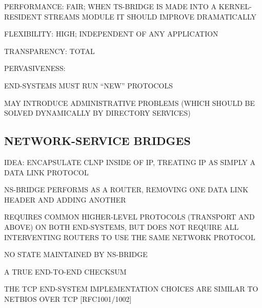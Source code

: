 \begin{bwslide}

\begin{nrtc}
\item	PERFORMANCE: FAIR; WHEN TS-BRIDGE IS MADE INTO A KERNEL-RESIDENT
	STREAMS MODULE IT SHOULD IMPROVE DRAMATICALLY

\item	FLEXIBILITY: HIGH; INDEPENDENT OF ANY APPLICATION

\item	TRANSPARENCY: TOTAL

\item	PERVASIVENESS:
    \begin{nrtc}
    \item	END-SYSTEMS MUST RUN ``NEW'' PROTOCOLS

    \item	MAY INTRODUCE ADMINISTRATIVE PROBLEMS (WHICH SHOULD BE SOLVED
		DYNAMICALLY BY DIRECTORY SERVICES)
    \end{nrtc}
\end{nrtc}
\end{bwslide}


\begin{bwslide}
\part*	{NETWORK-SERVICE BRIDGES}\bf

\begin{nrtc}
\item	IDEA: ENCAPSULATE CLNP INSIDE OF IP, TREATING IP AS SIMPLY A DATA LINK
	PROTOCOL

\item	NS-BRIDGE PERFORMS AS A ROUTER, REMOVING ONE DATA LINK HEADER AND
	ADDING ANOTHER

\item	REQUIRES COMMON HIGHER-LEVEL PROTOCOLS (TRANSPORT AND ABOVE) ON BOTH
	END-SYSTEMS, BUT DOES NOT REQUIRE ALL INTERVENTING ROUTERS TO USE THE
	SAME NETWORK PROTOCOL
\end{nrtc}
\end{bwslide}


\begin{bwslide}

\begin{nrtc}
\item	NO STATE MAINTAINED BY NS-BRIDGE

\item	A TRUE END-TO-END CHECKSUM

\item	THE TCP END-SYSTEM IMPLEMENTATION CHOICES ARE SIMILAR TO NETBIOS OVER
	TCP [RFC1001/1002]
\end{nrtc}
\end{bwslide}


